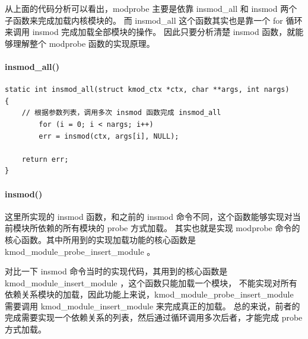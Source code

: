 \documentclass[11pt,a4paper]{article}
\begin{document}
从上面的代码分析可以看出，modprobe 主要是依靠 insmod\_all 和 insmod
两个子函数来完成加载内核模块的。 而 insmod\_all 这个函数其实也是靠一个
for 循环来调用 insmod 完成加载全部模块的操作。 因此只要分析清楚 insmod
函数，就能够理解整个 modprobe 函数的实现原理。

\paragraph{insmod\_all()}

{\begin{shaded}\begin{verbatim}
static int insmod_all(struct kmod_ctx *ctx, char **args, int nargs)
{
    // 根据参数列表，调用多次 insmod 函数完成 insmod_all
        for (i = 0; i < nargs; i++) 
        err = insmod(ctx, args[i], NULL);

    return err;
}
\end{verbatim}\end{shaded}}
\paragraph{insmod()}

这里所实现的 insmod 函数，和之前的 insmod
命令不同，这个函数能够实现对当前模块所依赖的所有模块的 probe 方式加载。
其实也就是实现 modprobe
命令的核心函数。其中所用到的实现加载功能的核心函数是
kmod\_module\_probe\_insert\_module 。

对比一下 insmod 命令当时的实现代码，其用到的核心函数是
kmod\_module\_insert\_module ，这个函数只能加载一个模块，
不能实现对所有依赖关系模块的加载，因此功能上来说，kmod\_module\_probe\_insert\_module
需要调用 kmod\_module\_insert\_module 来完成真正的加载。
总的来说，前者的完成需要实现一个依赖关系的列表，然后通过循环调用多次后者，才能完成
probe 方式加载。
\end{document}
